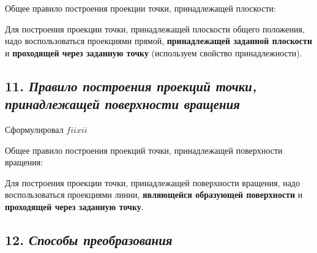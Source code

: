 Общее правило построения проекции точки, принадлежащей плоскости:

Для построения проекции точки, принадлежащей плоскости общего положения, надо воспользоваться проекциями прямой, {\bf принадлежащей заданной плоскости} и {\bf проходящей через заданную точку} (используем свойство принадлежности).



\newpage
\subsection*{11. \textit{Правило построения проекций точки, принадлежащей поверхности вращения}}

\begin{mainQuote}
    \centering Сформулировал $fiixii$
\end{mainQuote}

Общее правило построения проекций точки, принадлежащей поверхности вращения:

Для построения проекции точки, принадлежащей поверхности вращения, надо воспользоваться проекциями линии, {\bf являющейся образующей поверхности} и {\bf проходящей через заданную точку}. 


\newpage
\subsection*{12. \textit{Способы преобразования}}

\begin{mainQuote}
    
\end{mainQuote}

